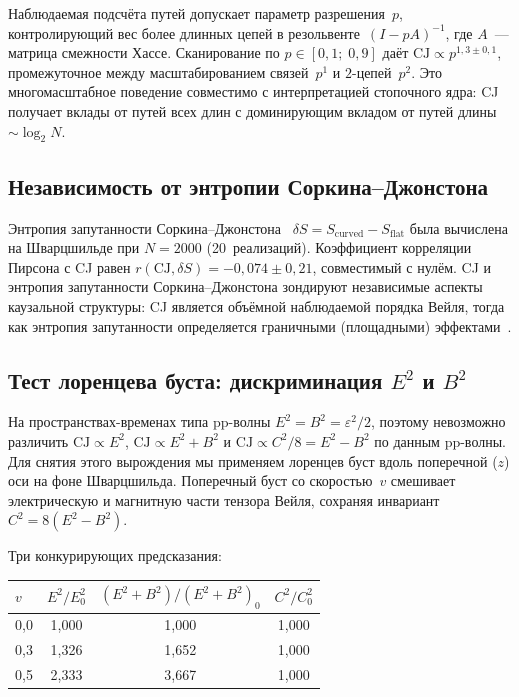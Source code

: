 \documentclass[12pt,a4paper]{article}
\theoremstyle{plain}
\theoremstyle{definition}
\theoremstyle{remark}
\newcommand{\CJ}{\mathrm{CJ}}
\begin{document}
Наблюдаемая подсчёта путей допускает параметр
разрешения~$p$, контролирующий вес более длинных цепей
в резольвенте~$(I - pA)^{-1}$, где $A$~--- матрица
смежности Хассе.  Сканирование по
$p \in [0{,}1;\; 0{,}9]$ даёт
$\CJ \propto p^{1{,}3 \pm 0{,}1}$, промежуточное между
масштабированием связей~$p^1$ и
$2$-цепей~$p^2$.  Это многомасштабное поведение совместимо
с интерпретацией стопочного ядра: CJ получает вклады от
путей всех длин с доминирующим вкладом от путей длины
$\sim \log_2 N$.

\subsection{Независимость от энтропии Соркина--Джонстона}
\label{sec:sjentropy}

Энтропия запутанности
Соркина--Джонстона~\cite{Sorkin:2012,SorkinYazdi:2018}
$\delta S = S_{\mathrm{curved}} - S_{\mathrm{flat}}$
была вычислена на Шварцшильде при $N = 2000$
(20~реализаций).  Коэффициент корреляции Пирсона с CJ
равен $r(\CJ, \delta S) = -0{,}074 \pm 0{,}21$, совместимый
с нулём.  CJ и энтропия запутанности Соркина--Джонстона
зондируют независимые аспекты каузальной структуры: CJ
является объёмной наблюдаемой порядка Вейля, тогда как
энтропия запутанности определяется граничными
(площадными) эффектами~\cite{SorkinYazdi:2018}.

\subsection{Тест лоренцева буста: дискриминация $E^2$ и $B^2$}
\label{sec:boost}

На пространствах-временах типа pp-волны $E^2 = B^2 = \varepsilon^2/2$,
поэтому невозможно различить $\CJ \propto E^2$,
$\CJ \propto E^2 + B^2$ и $\CJ \propto C^2/8 = E^2 - B^2$
по данным pp-волны.  Для снятия этого вырождения мы применяем
лоренцев буст вдоль поперечной ($z$) оси на фоне Шварцшильда.
Поперечный буст со скоростью~$v$ смешивает электрическую и
магнитную части тензора Вейля, сохраняя инвариант
$C^2 = 8(E^2 - B^2)$.

Три конкурирующих предсказания:
\begin{center}
\begin{tabular}{lccc}
\toprule
$v$ & $E^2/E^2_0$ & $(E^2{+}B^2)/(E^2{+}B^2)_0$ & $C^2/C^2_0$ \\
\midrule
0,0 & 1,000 & 1,000 & 1,000 \\
0,3 & 1,326 & 1,652 & 1,000 \\
0,5 & 2,333 & 3,667 & 1,000 \\
\bottomrule
\end{tabular}
\end{center}
\end{document}
